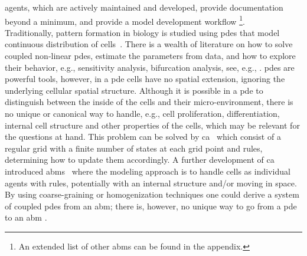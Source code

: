 agents, which are actively maintained and developed, provide documentation beyond a
minimum, and provide a model development workflow \footnote{An extended list of other
\acp{abm} can be found in the appendix.}.\\
Traditionally, pattern formation in biology is studied using \acp{pde} that model
continuous distribution of
cells~\cite{Kolmogorov1937,Turing1952,Koch1994,Gierer1972}.
There is a wealth of literature on how to solve coupled non-linear \acp{pde}, estimate
the parameters from data, and how to explore their behavior, e.g., sensitivity analysis,
bifurcation analysis, see, e.g.,
\cite{Browder1998,Muller2004,Stavroulakis2004,Baker2008,Saltelli2008,Kielhfer2012}.
\acp{pde} are powerful tools, however, in a \ac{pde} cells have no spatial extension,
ignoring the underlying cellular spatial structure.
Although it is possible in a \ac{pde} to distinguish between the inside of the cells and
their micro-environment, there is no unique or canonical way to handle, e.g., cell
proliferation, differentiation, internal cell structure and other properties of the
cells, which may be relevant for the questions at hand.
This problem can be solved by \ac{ca}~\cite{VonNeumann1966}
which consist of a regular grid with a finite number of states at each grid point and
rules, determining how to update them accordingly.
A further development of \ac{ca} introduced
\acp{abm}~\cite{Schelling1971,Reynolds1987,Glen2019}
where the modeling approach is to handle cells as individual agents with rules,
potentially with an internal structure and/or moving in space.
By using coarse-graining or homogenization techniques one could derive a system of
coupled \acp{pde} from an \ac{abm}; there is, however, no unique way to go from a
\ac{pde} to an \ac{abm} \cite{Nandakumaran2007}.

